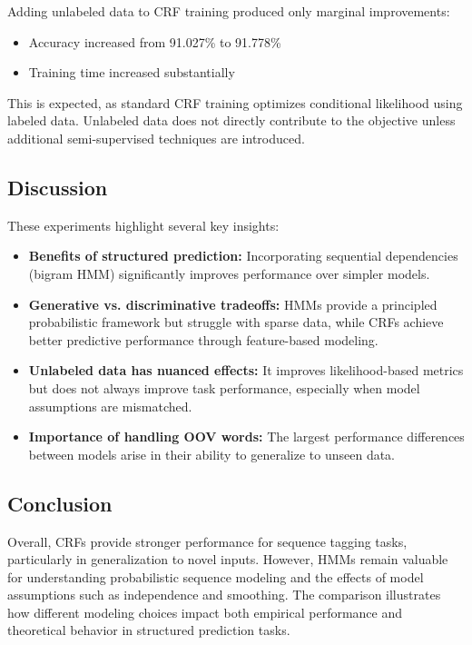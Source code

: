 \documentclass{article}
\begin{document}
Adding unlabeled data to CRF training produced only marginal improvements:

\begin{itemize}
    \item Accuracy increased from 91.027\% to 91.778\%
    \item Training time increased substantially
\end{itemize}

This is expected, as standard CRF training optimizes conditional likelihood using labeled data. Unlabeled data does not directly contribute to the objective unless additional semi-supervised techniques are introduced.

\subsection{Discussion}

These experiments highlight several key insights:

\begin{itemize}
    \item \textbf{Benefits of structured prediction:} Incorporating sequential dependencies (bigram HMM) significantly improves performance over simpler models.
    \item \textbf{Generative vs. discriminative tradeoffs:} HMMs provide a principled probabilistic framework but struggle with sparse data, while CRFs achieve better predictive performance through feature-based modeling.
    \item \textbf{Unlabeled data has nuanced effects:} It improves likelihood-based metrics but does not always improve task performance, especially when model assumptions are mismatched.
    \item \textbf{Importance of handling OOV words:} The largest performance differences between models arise in their ability to generalize to unseen data.
\end{itemize}

\subsection{Conclusion}

Overall, CRFs provide stronger performance for sequence tagging tasks, particularly in generalization to novel inputs. However, HMMs remain valuable for understanding probabilistic sequence modeling and the effects of model assumptions such as independence and smoothing. The comparison illustrates how different modeling choices impact both empirical performance and theoretical behavior in structured prediction tasks.
\end{document}
